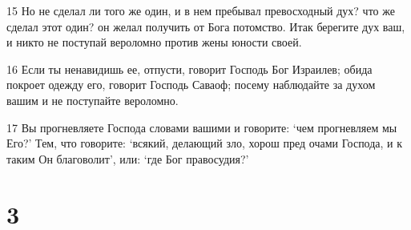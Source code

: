 \par 15 Но не сделал ли того же один, и в нем пребывал превосходный дух? что же сделал этот один? он желал получить от Бога потомство. Итак берегите дух ваш, и никто не поступай вероломно против жены юности своей.
\par 16 Если ты ненавидишь ее, отпусти, говорит Господь Бог Израилев; обида покроет одежду его, говорит Господь Саваоф; посему наблюдайте за духом вашим и не поступайте вероломно.
\par 17 Вы прогневляете Господа словами вашими и говорите: `чем прогневляем мы Его?' Тем, что говорите: `всякий, делающий зло, хорош пред очами Господа, и к таким Он благоволит', или: `где Бог правосудия?'

\chapter{3}

